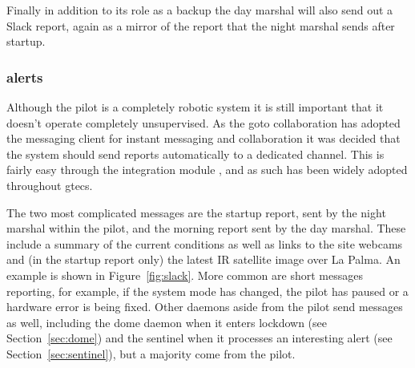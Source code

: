 \begin{colsection}
\begin{colsection}
Finally in addition to its role as a backup the day marshal will also send out a Slack report, again as a mirror of the report that the night marshal sends after startup.

\subsubsection{ alerts}

Although the pilot is a completely robotic system it is still important that it doesn't operate completely unsupervised. As the \gls{goto} collaboration has adopted the  messaging client for instant messaging and collaboration it was decided that the system should send reports automatically to a dedicated  channel. This is fairly easy through the   integration module , and as such has been widely adopted throughout \gls{gtecs}.

The two most complicated messages are the startup report, sent by the night marshal within the pilot, and the morning report sent by the day marshal. These include a summary of the current conditions as well as links to the site webcams and (in the startup report only) the latest IR satellite image over La Palma. An example is shown in Figure~\ref{fig:slack}. More common are short messages reporting, for example, if the system mode has changed, the pilot has paused or a hardware error is being fixed. Other daemons aside from the pilot send  messages as well, including the dome daemon when it enters lockdown (see Section~\ref{sec:dome}) and the sentinel when it processes an interesting alert (see Section~\ref{sec:sentinel}), but a majority come from the pilot.


\end{colsection}
\end{colsection}
